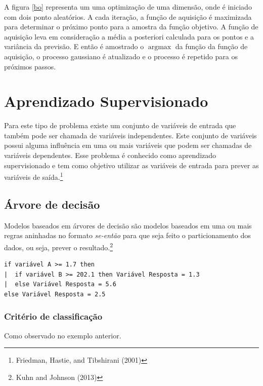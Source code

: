 \documentclass[
	12pt,				%
	a4paper,		%
	oneside,    %
	chapter=TITLE,		   %
	section=TITLE,		   %
	subsection=TITLE,	   %
	subsubsection=TITLE, %
	english,			%
	french,				%
	spanish,			%
	brazil,				%
]{abntex2}
\begin{document}
A figura \ref{bo} representa um uma optimização de uma dimensão, onde é
iniciado com dois ponto aleatórios. A cada iteração, a função de
aquisição é maximizada para determinar o próximo ponto para a amostra da
função objetivo. A função de aquisição leva em consideração a média a
posteriori calculada para os pontos e a variância da previsão. E então é
amostrado o \(\operatorname{argmax}\) da função da função de aquisição,
o processo gaussiano é atualizado e o processo é repetido para os
próximos passos.

\hypertarget{aprendizado-supervisionado}{%
\section{Aprendizado Supervisionado}\label{aprendizado-supervisionado}}

Para este tipo de problema existe um conjunto de variáveis de entrada
que também pode ser chamada de variáveis independentes. Este conjunto de
variáveis possui alguma influência em uma ou mais variáveis que podem
ser chamadas de variáveis dependentes. Esse problema é conhecido como
aprendizado supervisionado e tem como objetivo utilizar as variáveis de
entrada para prever as variáveis de saída.\footnote{Friedman, Hastie,
  and Tibshirani (2001)}

\hypertarget{uxe1rvore-de-decisuxe3o}{%
\subsection{Árvore de decisão}\label{uxe1rvore-de-decisuxe3o}}

Modelos baseados em árvores de decisão são modelos baseados em uma ou
mais regras aninhadas no formato \emph{se-então} para que seja feito o
particionamento dos dados, ou seja, prever o resultado.\footnote{Kuhn
  and Johnson (2013)}

\begin{verbatim}
if variável A >= 1.7 then
|  if variável B >= 202.1 then Variável Resposta = 1.3
|  else Variável Resposta = 5.6
else Variável Resposta = 2.5
\end{verbatim}

\hypertarget{crituxe9rio-de-classificauxe7uxe3o}{%
\subsubsection{Critério de
classificação}\label{crituxe9rio-de-classificauxe7uxe3o}}

Como observado no exemplo anterior.
\end{document}
